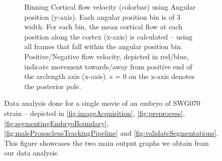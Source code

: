 \begin{figure}[h]
\begin{subfigure}[t]{0.5\textwidth}
    \caption{Binning Cortical flow velocity (colorbar) using Angular position (y-axis). Each angular position bin is of \SI{3}{\unitAngle} width. For each bin, the mean cortical flow at each position along the cortex (x-axis) is calculated -- using all frames that fall within the angular position bin. Positive/Negative flow velocity, depicted in red/blue, indicate movement towards/away from positive end of the arclength axis (x-axis). s = \SI{0}{\unitLength} on the x-axis denotes the posterior pole.} 
    \label{subfig:dataAnalysisExample-crtxFlow}
\end{subfigure}

\caption[Data Analysis (example movie only)]{Data analysis done for a single movie of an embryo of SWG070 strain -- depicted in \autoref{fig:imageAcquisition}, \autoref{fig:preprocess}, \autoref{fig:segmentingEmbryoBoundary}, \autoref{fig:malePronucleusTrackingPipeline} and \autoref{fig:validateSegmentations}. This figure showcases the two main output graphs we obtain from our data analysis.}
\label{fig:dataAnalysisExample}
\end{figure}